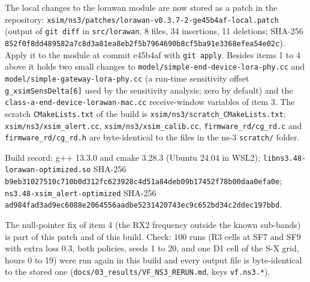 The local changes to the lorawan module are now stored as a patch in the repository: \texttt{xsim/ns3/patches/lorawan-v0.3.7-2-ge45b4af-local.patch} (output of \texttt{git diff} in \texttt{src/lorawan}, 8 files, 34 insertions, 11 deletions; SHA-256 \texttt{852f0f8dd489582a7c8d3a81ea8eb2f5b7964690b8cf5ba91e3368efea54e02c}). Apply it to the module at commit e45b4af with \texttt{git apply}. Besides items 1 to 4 above it holds two small changes to \texttt{model/simple-end-device-lora-phy.cc} and \texttt{model/simple-gateway-lora-phy.cc} (a run-time sensitivity offset \texttt{g\_xsimSensDelta[6]} used by the sensitivity analysis; zero by default) and the \texttt{class-a-end-device-lorawan-mac.cc} receive-window variables of item 3. The scratch \texttt{CMakeLists.txt} of the build is \texttt{xsim/ns3/scratch\_CMakeLists.txt}; \texttt{xsim/ns3/xsim\_alert.cc}, \texttt{xsim/ns3/xsim\_calib.cc}, \texttt{firmware\_rd/cg\_rd.c} and \texttt{firmware\_rd/cg\_rd.h} are byte-identical to the files in the ns-3 \texttt{scratch/} folder.

Build record: g++ 13.3.0 and cmake 3.28.3 (Ubuntu 24.04 in WSL2); \texttt{libns3.48-lorawan-optimized.so} SHA-256 \texttt{b9eb31027510c710b0d312fc623928c4d51a84deb09b17452f78b00daa0efa0e}; \texttt{ns3.48-xsim\_alert-optimized} SHA-256 \texttt{ad984fad3ad9ec6088e2064556aadbe5231420743ec9c652bd34c2ddec197bbd}.

The null-pointer fix of item 4 (the RX2 frequency outside the known sub-bands) is part of this patch and of this build. Check: 100 runs (R3 cells at SF7 and SF9 with extra loss 0.3, both policies, seeds 1 to 20, and one D1 cell of the S-X grid, hours 0 to 19) were run again in this build and every output file is byte-identical to the stored one (\texttt{docs/03\_results/VF\_NS3\_RERUN.md}, keys \texttt{vf.ns3.*}).

